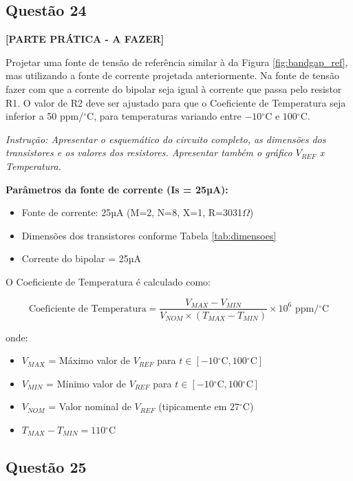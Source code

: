 \documentclass[12pt,a4paper]{article}
\newcommand{\degree}{\ensuremath{{}^\circ}}
\begin{document}
\subsection*{Questão 24}

\textbf{[PARTE PRÁTICA - A FAZER]}

Projetar uma fonte de tensão de referência similar à da Figura \ref{fig:bandgap_ref}, mas utilizando a fonte de corrente projetada anteriormente. Na fonte de tensão fazer com que a corrente do bipolar seja igual à corrente que passa pelo resistor R1. O valor de R2 deve ser ajustado para que o Coeficiente de Temperatura seja inferior a 50 ppm/$\degree$C, para temperaturas variando entre $-10\degree$C e $100\degree$C.

\textit{Instrução: Apresentar o esquemático do circuito completo, as dimensões dos transistores e os valores dos resistores. Apresentar também o gráfico $V_{REF}$ x Temperatura.}

\textbf{Parâmetros da fonte de corrente (Is = 25µA):}
\begin{itemize}
    \item Fonte de corrente: 25µA (M=2, N=8, X=1, R=3031$\Omega$)
    \item Dimensões dos transistores conforme Tabela \ref{tab:dimensoes}
    \item Corrente do bipolar = 25µA
\end{itemize}

O Coeficiente de Temperatura é calculado como:

$$\text{Coeficiente de Temperatura} = \frac{V_{MAX} - V_{MIN}}{V_{NOM} \times (T_{MAX} - T_{MIN})} \times 10^6 \text{ ppm}/\degree\text{C}$$

onde:
\begin{itemize}
    \item $V_{MAX}$ = Máximo valor de $V_{REF}$ para $t \in [-10\degree\text{C}, 100\degree\text{C}]$
    \item $V_{MIN}$ = Mínimo valor de $V_{REF}$ para $t \in [-10\degree\text{C}, 100\degree\text{C}]$
    \item $V_{NOM}$ = Valor nominal de $V_{REF}$ (tipicamente em $27\degree\text{C}$)
    \item $T_{MAX} - T_{MIN} = 110\degree\text{C}$
\end{itemize}

\subsection*{Questão 25}
\end{document}

